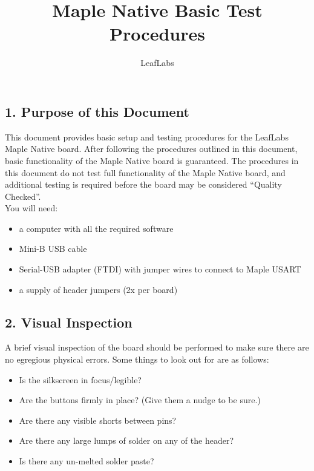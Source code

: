 \documentclass[a4paper,12pt]{report}
\begin{document}
\title{Maple Native Basic Test Procedures}
\author{LeafLabs}
\maketitle

\section*{}
\subsection*{1. Purpose of this Document}
This document provides basic setup and testing procedures for the LeafLabs Maple Native board. After following the procedures outlined in this document, basic functionality of the Maple Native board is guaranteed. The procedures in this document do not test full functionality of the Maple Native board, and additional testing is required before the board may be considered ``Quality Checked''.\\

You will need:

\begin{itemize}
\item a computer with all the required software
\item Mini-B USB cable
\item Serial-USB adapter (FTDI) with jumper wires to connect to Maple USART
\item a supply of header jumpers (2x per board)
\end{itemize}

\subsection*{2. Visual Inspection}

A brief visual inspection of the board should be performed to make sure there are no egregious physical errors. Some things to look out for are as follows:
\begin{itemize}
\item Is the silkscreen in focus/legible?
\item Are the buttons firmly in place? (Give them a nudge to be sure.)
\item Are there any visible shorts between pins?
\item Are there any large lumps of solder on any of the header?
\item Is there any un-melted solder paste?
\end{itemize}
\end{document}
